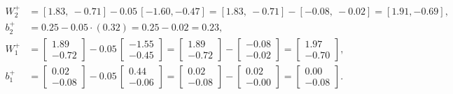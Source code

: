 \documentclass[11pt]{article}
\begin{document}
\begin{align*}
W_2^+&=[1.83,\ -0.71]-0.05\,[-1.60, -0.47]=[1.83,\ -0.71]-[-0.08,\ -0.02]=[1.91, -0.69],\\
b_2^+&=0.25-0.05\cdot(0.32)=0.25-0.02=0.23,\\
W_1^+&=\begin{bmatrix}1.89\\-0.72\end{bmatrix}-0.05\,\begin{bmatrix}-1.55\\-0.45\end{bmatrix}=\begin{bmatrix}1.89\\-0.72\end{bmatrix}-\begin{bmatrix}-0.08\\-0.02\end{bmatrix}=\begin{bmatrix}1.97\\-0.70\end{bmatrix},\\
b_1^+&=\begin{bmatrix}0.02\\-0.08\end{bmatrix}-0.05\,\begin{bmatrix}0.44\\-0.06\end{bmatrix}=\begin{bmatrix}0.02\\-0.08\end{bmatrix}-\begin{bmatrix}0.02\\-0.00\end{bmatrix}=\begin{bmatrix}0.00\\-0.08\end{bmatrix}.
\end{align*}
\end{document}
